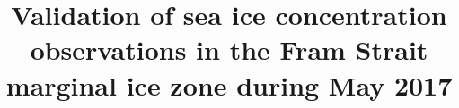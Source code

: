 \documentclass[draft,linenumbers]{agujournal}
\begin{document}

% 
%


\title{Validation of sea ice concentration observations in the Fram Strait marginal ice zone during May 2017}


%
%









\end{document}
